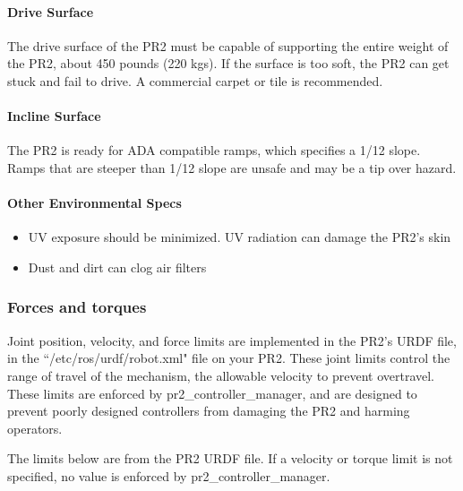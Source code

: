 \paragraph{Drive Surface}

The drive surface of the PR2 must be capable of supporting the entire weight of the PR2, about 450 pounds (220 kgs). If the surface is too soft, the PR2 can get stuck and fail to drive. A commercial carpet or tile is recommended. 

\paragraph{Incline Surface}

The PR2 is ready for ADA compatible ramps, which specifies a 1/12 slope. Ramps that are steeper than 1/12 slope are unsafe and may be a tip over hazard.

\paragraph{Other Environmental Specs}

\begin{itemize}
\item UV exposure should be minimized. UV radiation can damage the PR2's skin
\item Dust and dirt can clog air filters
\end{itemize}

\subsubsection{Forces and torques}

Joint position, velocity, and force limits are implemented in the PR2's URDF file, in the ``/etc/ros/urdf/robot.xml" file on your PR2. These joint limits control the range of travel of the mechanism, the allowable velocity to prevent overtravel. These limits are enforced by pr2\_controller\_manager, and are designed to prevent poorly designed controllers from damaging the PR2 and harming operators. 



The limits below are from the PR2 URDF file. If a velocity or torque limit is not specified, no value is enforced by pr2\_controller\_manager.

